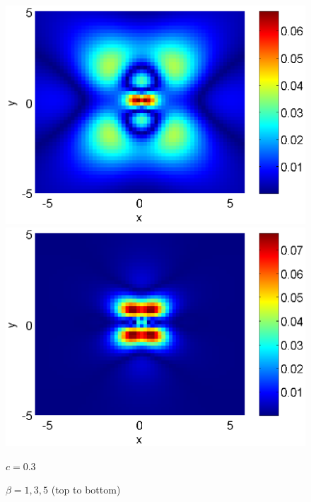\documentclass[leqno,11pt]{book}
\begin{document}
\begin{figure}[htbp]
\begin{minipage}[b]{0.48\linewidth}
	\end{minipage}
	\begin{minipage}[b]{0.48\linewidth}
		\raggedright
		 \includegraphics[width=\linewidth]{differences/difference_c=05_beta=1.eps}
	\end{minipage}
	\begin{minipage}[b]{0.48\linewidth}
		\raggedleft
		 \includegraphics[width=\linewidth]{differences/difference_c=03_beta=5.eps}
		\centerline{$c=0.3$}
		\centerline{$\beta = 1,3,5$ (top to bottom) }
	\end{minipage}
	\begin{minipage}[b]{0.48\linewidth}
		\raggedright

\end{minipage}
\end{figure}
\end{document}
